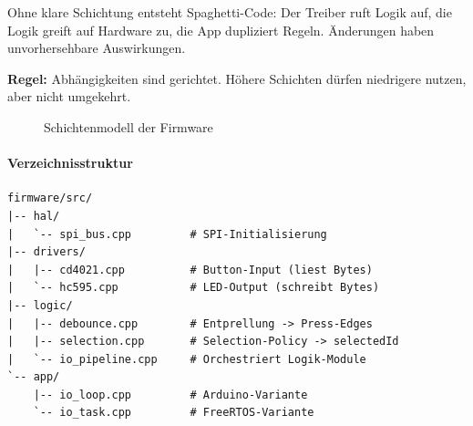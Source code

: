 Ohne klare Schichtung entsteht \glqq Spaghetti-Code\grqq: Der Treiber ruft Logik auf,
die Logik greift auf Hardware zu, die App dupliziert Regeln. Änderungen haben
unvorhersehbare Auswirkungen.

\textbf{Regel:} Abhängigkeiten sind gerichtet. Höhere Schichten dürfen niedrigere
nutzen, aber nicht umgekehrt.

\begin{figure}[H]
\centering
{}
\caption{Schichtenmodell der Firmware}
\label{fig:schichtenmodell}
\end{figure}

\paragraph{Verzeichnisstruktur}

\begin{lstlisting}[style=shell,numbers=none,caption={Firmware-Verzeichnisstruktur},label={lst:firmware-struktur}]
firmware/src/
|-- hal/
|   `-- spi_bus.cpp         # SPI-Initialisierung
|-- drivers/
|   |-- cd4021.cpp          # Button-Input (liest Bytes)
|   `-- hc595.cpp           # LED-Output (schreibt Bytes)
|-- logic/
|   |-- debounce.cpp        # Entprellung -> Press-Edges
|   |-- selection.cpp       # Selection-Policy -> selectedId
|   `-- io_pipeline.cpp     # Orchestriert Logik-Module
`-- app/
    |-- io_loop.cpp         # Arduino-Variante
    `-- io_task.cpp         # FreeRTOS-Variante
\end{lstlisting}


